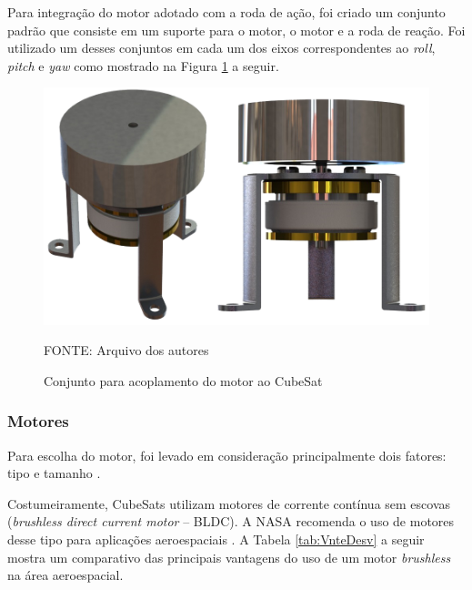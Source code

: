 \documentclass[
	12pt,				%
	openany,			%
	twoside,			%
	a4paper,			%
	english,			%
	french,				%
	spanish,			%
	brazil,				%
	oldfontcommands
	]{abntex2}
\begin{document}

Para integração do motor adotado com a roda de ação, foi criado um conjunto padrão que consiste em um suporte para o motor, o motor e a roda de reação. Foi utilizado um desses conjuntos em cada um dos eixos correspondentes ao \textit{roll}, \textit{pitch} e \textit{yaw} como mostrado na Figura \ref{fig:MotSet} a seguir.

\begin{figure}[th]
	\caption{Conjunto para acoplamento do motor ao CubeSat}
	\centering
	\includegraphics[width=0.7\linewidth]{./figs/Motor_Set}
	
	\begin{small}
		FONTE: Arquivo dos autores
	\end{small}
	\label{fig:MotSet}
\end{figure}


\subsubsection{Motores}

Para escolha do motor, foi levado em consideração principalmente dois fatores: tipo e tamanho \cite{Ericksson}.

Costumeiramente, CubeSats utilizam motores de corrente contínua sem escovas (\textit{brushless direct current motor} – BLDC). A NASA recomenda o uso de motores desse tipo para aplicações aeroespaciais \cite{NASABLDC}. A Tabela \ref{tab:VnteDesv} a seguir mostra um comparativo das principais vantagens do uso de um motor \textit{brushless} na área aeroespacial.
\end{document}
